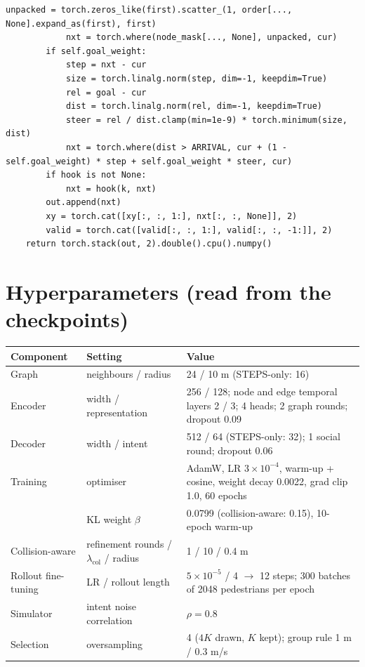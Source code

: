 \documentclass[10pt]{article}
\begin{document}
\begin{lstlisting}[aboveskip=2pt]
            unpacked = torch.zeros_like(first).scatter_(1, order[..., None].expand_as(first), first)
            nxt = torch.where(node_mask[..., None], unpacked, cur)
        if self.goal_weight:
            step = nxt - cur
            size = torch.linalg.norm(step, dim=-1, keepdim=True)
            rel = goal - cur
            dist = torch.linalg.norm(rel, dim=-1, keepdim=True)
            steer = rel / dist.clamp(min=1e-9) * torch.minimum(size, dist)
            nxt = torch.where(dist > ARRIVAL, cur + (1 - self.goal_weight) * step + self.goal_weight * steer, cur)
        if hook is not None:
            nxt = hook(k, nxt)
        out.append(nxt)
        xy = torch.cat([xy[:, :, 1:], nxt[:, :, None]], 2)
        valid = torch.cat([valid[:, :, 1:], valid[:, :, -1:]], 2)
    return torch.stack(out, 2).double().cpu().numpy()
\end{lstlisting}

\appendix
\section{Hyperparameters (read from the checkpoints)}
\begin{tabularx}{\textwidth}{@{}l l X@{}}
\toprule
Component & Setting & Value \\
\midrule
Graph & neighbours / radius & 24 / 10 m (STEPS-only: 16) \\
Encoder & width / representation & 256 / 128; node and edge temporal layers 2 / 3; 4 heads; 2 graph rounds; dropout 0.09 \\
Decoder & width / intent & 512 / 64 (STEPS-only: 32); 1 social round; dropout 0.06 \\
Training & optimiser & AdamW, LR $3\times10^{-4}$, warm-up + cosine, weight decay 0.0022, grad clip 1.0, 60 epochs \\
& KL weight $\beta$ & 0.0799 (collision-aware: 0.15), 10-epoch warm-up \\
Collision-aware & refinement rounds / $\lambda_{\text{col}}$ / radius & 1 / 10 / 0.4 m \\
Rollout fine-tuning & LR / rollout length & $5\times10^{-5}$ / 4 $\to$ 12 steps; 300 batches of 2048 pedestrians per epoch \\
Simulator & intent noise correlation & $\rho=0.8$ \\
Selection & oversampling & 4 ($4K$ drawn, $K$ kept); group rule 1 m / 0.3 m/s \\
\bottomrule
\end{tabularx}
\end{document}
